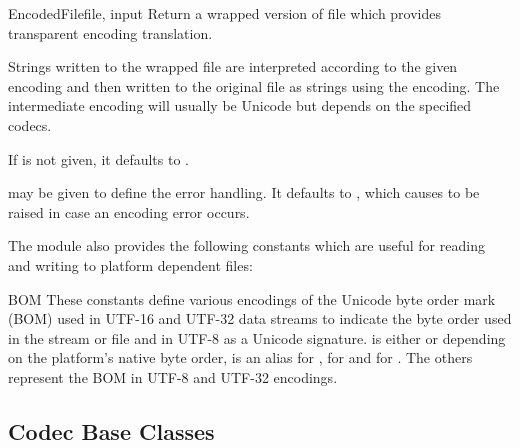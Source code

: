\begin{funcdesc}{EncodedFile}{file, input}
Return a wrapped version of file which provides transparent
encoding translation.

Strings written to the wrapped file are interpreted according to the
given  encoding and then written to the original file as
strings using the  encoding. The intermediate encoding will
usually be Unicode but depends on the specified codecs.

If  is not given, it defaults to .

 may be given to define the error handling. It defaults to
, which causes  to be raised in case
an encoding error occurs.
\end{funcdesc}

The module also provides the following constants which are useful
for reading and writing to platform dependent files:

\begin{datadesc}{BOM}
These constants define various encodings of the Unicode byte order mark
(BOM) used in UTF-16 and UTF-32 data streams to indicate the byte order
used in the stream or file and in UTF-8 as a Unicode signature.
 is either  or
 depending on the platform's native byte order,
 is an alias for , 
for  and  for .
The others represent the BOM in UTF-8 and UTF-32 encodings.
\end{datadesc}


\begin{seealso}
\end{seealso}


\subsection{Codec Base Classes}

